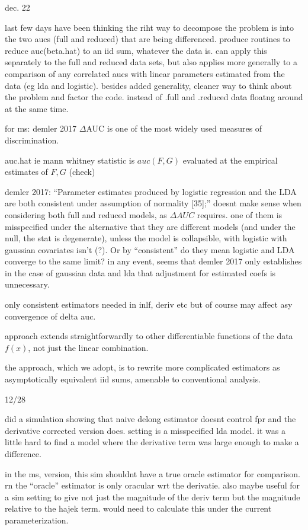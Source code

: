 \documentclass{article}
\begin{document}
dec. 22

last few days have been thinking the riht way to decompose the problem
is into the two aucs (full and reduced) that are being
differenced. produce routines to reduce auc(beta.hat) to an iid sum,
whatever the data is. can apply this separately to the full and
reduced data sets, but also applies more generally to a comparison of
any correlated aucs with linear parameters estimated from the data (eg
lda and logistic). besides added generality, cleaner way to think
about the problem and factor the code. instead of .full and .reduced
data floatng around at the same time.



for ms: demler 2017 $\Delta$AUC is one of the most widely used measures of discrimination.

auc.hat ie mann whitney statistic is $auc(F,G)$ evaluated at the empirical estimates of $F,G$ (check)


demler 2017: ``Parameter estimates produced by logistic regression and
the LDA are both consistent under assumption of normality [35];''
doesnt make sense when considering both full and reduced models, as
$\Delta AUC$ requires. one of them is misspecified under the
alternative that they are different models (and under the null, the
stat is degenerate), unless the model is collapsible, with logistic
with gaussian covariates isn't (?). Or by ``consistent'' do they mean
logistic and LDA converge to the same limit? in any event, seems that
demler 2017 only establishes in the case of gaussian data and lda that
adjustment for estimated coefs is unnecessary.


only consistent estimators needed in inlf, deriv etc but of course may affect asy convergence of delta auc.

approach extends straightforwardly to other differentiable functions
of the data $f(x)$, not just the linear combination.


the approach, which we adopt, is to rewrite more complicated
estimators as asymptotically equivalent iid sums, amenable to
conventional analysis.


12/28

did a simulation showing that naive delong estimator doesnt control
fpr and the derivative corrected version does. setting is a
misspecified lda model. it was a little hard to find a model where the
derivative term was large enough to make a difference.

in the ms, version, this sim shouldnt have a true oracle estimator for
comparison. rn the ``oracle'' estimator is only oracular wrt the
derivatie. also maybe useful for a sim setting to give not just the
magnitude of the deriv term but the magnitude relative to the hajek
term. would need to calculate this under the current parameterization.
\end{document}
